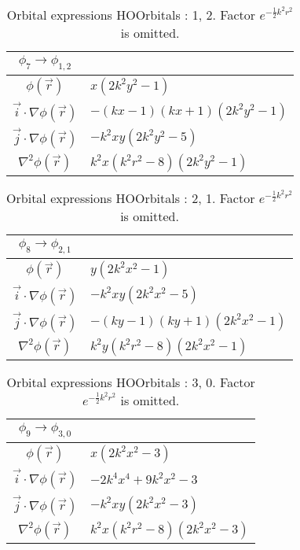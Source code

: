 \begin{table}
\begin{center}
\begin{tabular}{c|l}
$\phi_{7} \rightarrow \phi_{1, 2}$\\
\hline
$\phi(\vec r)$ & $x \left(2 k^{2} y^{2} -1\right)$\\
\hline
$\vec i\cdot \nabla \phi(\vec r)$ & $- \left(k x -1\right) \left(k x + 1\right) \left(2 k^{2} y^{2} -1\right)$\\
$\vec j\cdot \nabla \phi(\vec r)$ & $- k^{2} x y \left(2 k^{2} y^{2} -5\right)$\\
\hline
$\nabla^2 \phi(\vec r)$ & $k^{2} x \left(k^{2} r^{2} -8\right) \left(2 k^{2} y^{2} -1\right)$\\
\end{tabular}
\caption{Orbital expressions HOOrbitals : 1, 2. Factor $e^{- \frac{1}{2} k^{2} r^{2}}$ is omitted.}
\end{center}
\end{table}


\begin{table}
\begin{center}
\begin{tabular}{c|l}
$\phi_{8} \rightarrow \phi_{2, 1}$\\
\hline
$\phi(\vec r)$ & $y \left(2 k^{2} x^{2} -1\right)$\\
\hline
$\vec i\cdot \nabla \phi(\vec r)$ & $- k^{2} x y \left(2 k^{2} x^{2} -5\right)$\\
$\vec j\cdot \nabla \phi(\vec r)$ & $- \left(k y -1\right) \left(k y + 1\right) \left(2 k^{2} x^{2} -1\right)$\\
\hline
$\nabla^2 \phi(\vec r)$ & $k^{2} y \left(k^{2} r^{2} -8\right) \left(2 k^{2} x^{2} -1\right)$\\
\end{tabular}
\caption{Orbital expressions HOOrbitals : 2, 1. Factor $e^{- \frac{1}{2} k^{2} r^{2}}$ is omitted.}
\end{center}
\end{table}


\begin{table}
\begin{center}
\begin{tabular}{c|l}
$\phi_{9} \rightarrow \phi_{3, 0}$\\
\hline
$\phi(\vec r)$ & $x \left(2 k^{2} x^{2} -3\right)$\\
\hline
$\vec i\cdot \nabla \phi(\vec r)$ & $- 2 k^{4} x^{4} + 9 k^{2} x^{2} -3$\\
$\vec j\cdot \nabla \phi(\vec r)$ & $- k^{2} x y \left(2 k^{2} x^{2} -3\right)$\\
\hline
$\nabla^2 \phi(\vec r)$ & $k^{2} x \left(k^{2} r^{2} -8\right) \left(2 k^{2} x^{2} -3\right)$\\
\end{tabular}
\caption{Orbital expressions HOOrbitals : 3, 0. Factor $e^{- \frac{1}{2} k^{2} r^{2}}$ is omitted.}
\end{center}
\end{table}

